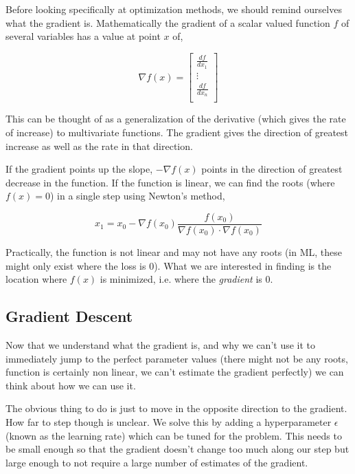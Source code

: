 \documentclass{article}
\begin{document}
Before looking specifically at optimization methods, we should remind ourselves what the gradient is. Mathematically the gradient of a scalar valued function $f$ of several variables has a value at point $x$ of,

\begin{equation}
    \nabla f(x) = \begin{bmatrix}
        \frac{df}{dx_{1}} \\
        \vdots \\
        \frac{df}{dx_{n}} \\
    \end{bmatrix}
\end{equation}

\noindent
This can be thought of as a generalization of the derivative (which gives the rate of increase) to multivariate functions. The gradient gives the direction of greatest increase as well as the rate in that direction.

If the gradient points up the slope, $-\nabla f(x)$ points in the direction of greatest decrease in the function. If the function is linear, we can find the roots (where $f(x) = 0$) in a single step using Newton's method,

\begin{equation}
    x_1 = x_0 - \nabla f(x_0) \frac{f(x_0)}{\nabla f(x_0)  \cdot \nabla f(x_0)}
\end{equation}

\noindent
Practically, the function is not linear and may not have any roots (in ML, these might only exist where the loss is 0). What we are interested in finding is the location where $f(x)$ is minimized, i.e. where the {\em gradient} is 0.

\subsection{Gradient Descent}

Now that we understand what the gradient is, and why we can't use it to immediately jump to the perfect parameter values (there might not be any roots, function is certainly non linear, we can't estimate the gradient perfectly) we can think about how we can use it.

The obvious thing to do is just to move in the opposite direction to the gradient. How far to step though is unclear. We solve this by adding a hyperparameter $\epsilon$ (known as the learning rate) which can be tuned for the problem. This needs to be small enough so that the gradient doesn't change too much along our step but large enough to not require a large number of estimates of the gradient.
\end{document}
